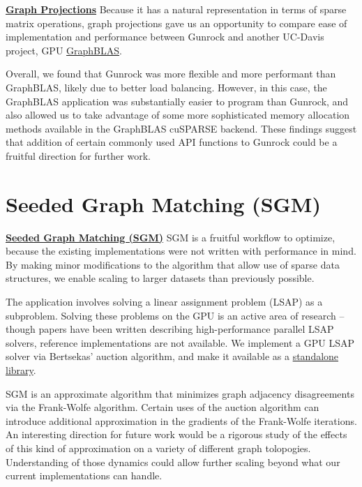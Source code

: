 \documentclass[10pt,oneside]{memoir}
\begin{document}
\textbf{\href{https://gunrock.github.io/docs/hive_proj.html}{Graph
Projections}} Because it has a natural representation in terms of sparse
matrix operations, graph projections gave us an opportunity to compare
ease of implementation and performance between Gunrock and another
UC-Davis project, GPU
\href{https://github.com/owensgroup/GraphBLAS}{GraphBLAS}.

Overall, we found that Gunrock was more flexible and more performant
than GraphBLAS, likely due to better load balancing. However, in this
case, the GraphBLAS application was substantially easier to program than
Gunrock, and also allowed us to take advantage of some more
sophisticated memory allocation methods available in the GraphBLAS
cuSPARSE backend. These findings suggest that addition of certain
commonly used API functions to Gunrock could be a fruitful direction for
further work.

\hypertarget{seeded-graph-matching-sgm}{%
\section{Seeded Graph Matching (SGM)}\label{seeded-graph-matching-sgm}}

\textbf{\href{https://gunrock.github.io/docs/hive_sgm.html}{Seeded Graph
Matching (SGM)}} SGM is a fruitful workflow to optimize, because the
existing implementations were not written with performance in mind. By
making minor modifications to the algorithm that allow use of sparse
data structures, we enable scaling to larger datasets than previously
possible.

The application involves solving a linear assignment problem (LSAP) as a
subproblem. Solving these problems on the GPU is an active area of
research -- though papers have been written describing high-performance
parallel LSAP solvers, reference implementations are not available. We
implement a GPU LSAP solver via Bertsekas' auction algorithm, and make
it available as a \href{https://github.com/bkj/cbert}{standalone
library}.

SGM is an approximate algorithm that minimizes graph adjacency
disagreements via the Frank-Wolfe algorithm. Certain uses of the auction
algorithm can introduce additional approximation in the gradients of the
Frank-Wolfe iterations. An interesting direction for future work would
be a rigorous study of the effects of this kind of approximation on a
variety of different graph tolopogies. Understanding of those dynamics
could allow further scaling beyond what our current implementations can
handle.
\end{document}

